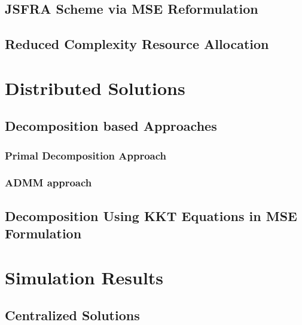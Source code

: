 \documentclass[10pt,final,twocolumn,letterpaper]{./../Styles/IEEEtran}
\begin{document}
\subsection{\ac{JSFRA} Scheme via \ac{MSE} Reformulation} \label{sec-3.3}


\subsection{Reduced Complexity Resource Allocation} \label{sec-3.4}


\section{Distributed Solutions} \label{sec-4}



\subsection{Decomposition based Approaches}

\subsubsection{Primal Decomposition Approach} \label{sec-4.1}


%

\subsubsection{\ac{ADMM} approach} \label{sec-4.2}


%

\subsection{Decomposition Using \ac{KKT} Equations in \ac{MSE} Formulation} \label{sec-4.3}



\section{Simulation Results} \label{sec-5}


\subsection{Centralized Solutions}

\end{document}
